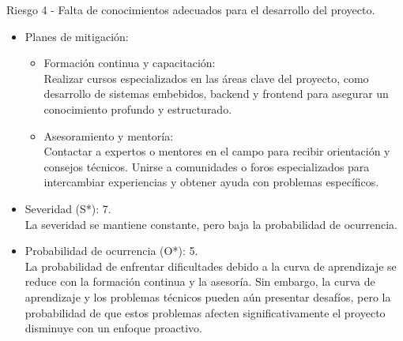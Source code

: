 Riesgo 4 - Falta de conocimientos adecuados para el desarrollo del proyecto.
\begin{itemize}
	\item Planes de mitigación:\\
	      \begin{itemize}
		      \item Formación continua y capacitación:\\ Realizar cursos especializados en las
		            áreas clave del proyecto, como desarrollo de sistemas embebidos, backend y
		            frontend para asegurar un conocimiento profundo y estructurado.
		      \item Asesoramiento y mentoría:\\ Contactar a expertos o mentores en el campo para
		            recibir orientación y consejos técnicos. Unirse a comunidades o foros
		            especializados para intercambiar experiencias y obtener ayuda con problemas
		            específicos.
	      \end{itemize}
	\item Severidad (S*): 7.\\ La severidad se mantiene constante, pero baja la probabilidad de ocurrencia.
	\item Probabilidad de ocurrencia (O*): 5.\\ La probabilidad de enfrentar dificultades
	      debido a la curva de aprendizaje se reduce con la formación continua y la
	      asesoría. Sin embargo, la curva de aprendizaje y los problemas técnicos pueden
	      aún presentar desafíos, pero la probabilidad de que estos problemas afecten
	      significativamente el proyecto disminuye con un enfoque proactivo.
\end{itemize}